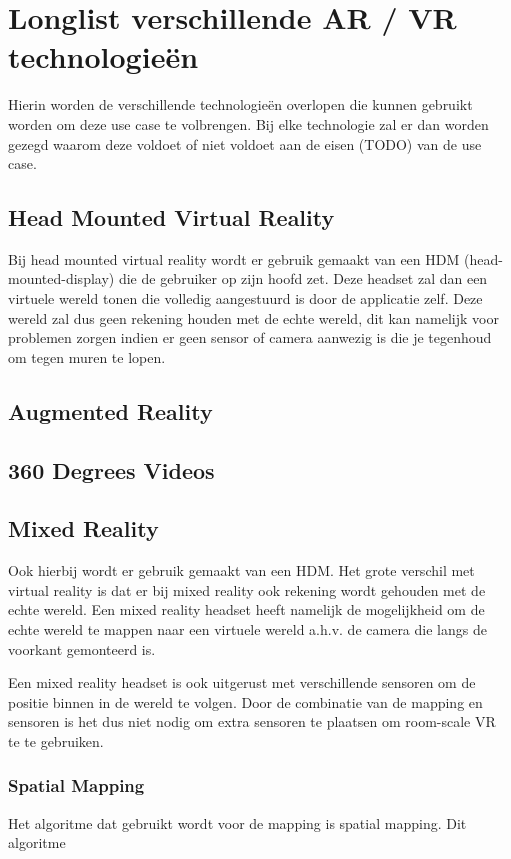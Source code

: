 \chapter{Longlist verschillende AR / VR technologieën}
\label{ch:longlist}

Hierin worden de verschillende technologieën overlopen die kunnen gebruikt worden om deze use case te volbrengen.
Bij elke technologie zal er dan worden gezegd waarom deze voldoet of niet voldoet aan de eisen (TODO) van de use case.

\section{Head Mounted Virtual Reality}
Bij head mounted virtual reality wordt er gebruik gemaakt van een HDM (head-mounted-display) die de gebruiker op zijn hoofd zet. Deze headset zal dan een virtuele wereld tonen die volledig aangestuurd is door de applicatie zelf. Deze wereld zal dus geen rekening houden met de echte wereld, dit kan namelijk voor problemen zorgen indien er geen sensor of camera aanwezig is die je tegenhoud om tegen muren te lopen.
\section{Augmented Reality}
\section{360 Degrees Videos}
\section{Mixed Reality}
Ook hierbij wordt er gebruik gemaakt van een HDM. Het grote verschil met virtual reality is dat er bij mixed reality ook rekening wordt gehouden met de echte wereld. Een mixed reality headset heeft namelijk de mogelijkheid om de echte wereld te mappen naar een virtuele wereld a.h.v. de camera die langs de voorkant gemonteerd is.

Een mixed reality headset is ook uitgerust met verschillende sensoren om de positie binnen in de wereld te volgen. Door de combinatie van de mapping en sensoren is het dus niet nodig om extra sensoren te plaatsen om room-scale VR te te gebruiken.
\subsection{Spatial Mapping}
Het algoritme dat gebruikt wordt voor de mapping is spatial mapping. Dit algoritme %